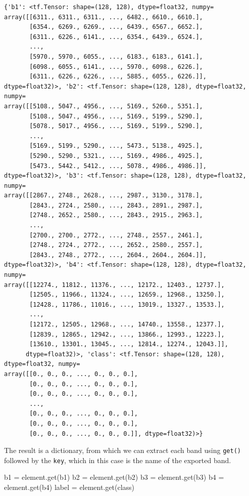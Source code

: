 \documentclass[
  letterpaper,
  DIV=11,
  numbers=noendperiod]{scrreprt}
\newenvironment{Shaded}{\begin{snugshade}}{\end{snugshade}}
\newcommand{\NormalTok}[1]{\textcolor[rgb]{0.00,0.23,0.31}{#1}}
\newcommand{\OperatorTok}[1]{\textcolor[rgb]{0.37,0.37,0.37}{#1}}
\newcommand{\StringTok}[1]{\textcolor[rgb]{0.13,0.47,0.30}{#1}}
\begin{document}
\begin{verbatim}
{'b1': <tf.Tensor: shape=(128, 128), dtype=float32, numpy=
array([[6311., 6311., 6311., ..., 6482., 6610., 6610.],
       [6354., 6269., 6269., ..., 6439., 6567., 6652.],
       [6311., 6226., 6141., ..., 6354., 6439., 6524.],
       ...,
       [5970., 5970., 6055., ..., 6183., 6183., 6141.],
       [6098., 6055., 6141., ..., 5970., 6098., 6226.],
       [6311., 6226., 6226., ..., 5885., 6055., 6226.]], dtype=float32)>, 'b2': <tf.Tensor: shape=(128, 128), dtype=float32, numpy=
array([[5108., 5047., 4956., ..., 5169., 5260., 5351.],
       [5108., 5047., 4956., ..., 5169., 5199., 5290.],
       [5078., 5017., 4956., ..., 5169., 5199., 5290.],
       ...,
       [5169., 5199., 5290., ..., 5473., 5138., 4925.],
       [5290., 5290., 5321., ..., 5169., 4986., 4925.],
       [5473., 5442., 5412., ..., 5078., 4986., 4986.]], dtype=float32)>, 'b3': <tf.Tensor: shape=(128, 128), dtype=float32, numpy=
array([[2867., 2748., 2628., ..., 2987., 3130., 3178.],
       [2843., 2724., 2580., ..., 2843., 2891., 2987.],
       [2748., 2652., 2580., ..., 2843., 2915., 2963.],
       ...,
       [2700., 2700., 2772., ..., 2748., 2557., 2461.],
       [2748., 2724., 2772., ..., 2652., 2580., 2557.],
       [2843., 2748., 2772., ..., 2604., 2604., 2604.]], dtype=float32)>, 'b4': <tf.Tensor: shape=(128, 128), dtype=float32, numpy=
array([[12274., 11812., 11376., ..., 12172., 12403., 12737.],
       [12505., 11966., 11324., ..., 12659., 12968., 13250.],
       [12428., 11786., 11016., ..., 13019., 13327., 13533.],
       ...,
       [12172., 12505., 12968., ..., 14740., 13558., 12377.],
       [12839., 12865., 12942., ..., 13866., 12993., 12223.],
       [13610., 13301., 13045., ..., 12814., 12274., 12043.]],
      dtype=float32)>, 'class': <tf.Tensor: shape=(128, 128), dtype=float32, numpy=
array([[0., 0., 0., ..., 0., 0., 0.],
       [0., 0., 0., ..., 0., 0., 0.],
       [0., 0., 0., ..., 0., 0., 0.],
       ...,
       [0., 0., 0., ..., 0., 0., 0.],
       [0., 0., 0., ..., 0., 0., 0.],
       [0., 0., 0., ..., 0., 0., 0.]], dtype=float32)>}
\end{verbatim}

The result is a dictionary, from which we can extract each band using
\texttt{get()} followed by the \texttt{key}, which in this case is the
name of the exported band.

\begin{Shaded}
\begin{Highlighting}[]
\NormalTok{b1 }\OperatorTok{=}\NormalTok{ element.get(}\StringTok{\textquotesingle{}b1\textquotesingle{}}\NormalTok{)}
\NormalTok{b2 }\OperatorTok{=}\NormalTok{ element.get(}\StringTok{\textquotesingle{}b2\textquotesingle{}}\NormalTok{)}
\NormalTok{b3 }\OperatorTok{=}\NormalTok{ element.get(}\StringTok{\textquotesingle{}b3\textquotesingle{}}\NormalTok{)}
\NormalTok{b4 }\OperatorTok{=}\NormalTok{ element.get(}\StringTok{\textquotesingle{}b4\textquotesingle{}}\NormalTok{)}
\NormalTok{label }\OperatorTok{=}\NormalTok{ element.get(}\StringTok{\textquotesingle{}class\textquotesingle{}}\NormalTok{)}
\end{Highlighting}
\end{Shaded}
\end{document}
